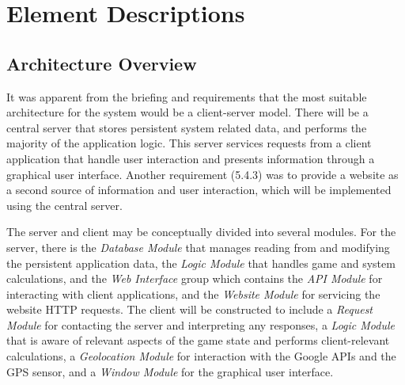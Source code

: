 \def\TabS#1#2{\small\tabular{#1}\rule[-1.5mm]{0pt}{5mm}{#2}
    \rule[-2mm]{0pt}{2mm}\endtabular\hspace{-1mm}}
\def\TabM#1#2{\tabular{#1}\rule[-1.5mm]{0pt}{7mm}{#2}
    \rule[-3mm]{0pt}{4mm}\endtabular\hspace{-1mm}}
\def\TabA#1#2#3{\small\tabular{#1}\rule[-1.5mm]{0pt}{5mm}\textbf{#2}\\
    \hline\rule[0mm]{0pt}{4mm}#3
    \rule[-2mm]{0pt}{2mm}\endtabular}
\def\TabB#1#2#3{\small\tabular{c}\rule[-1.5mm]{0pt}{5mm}
    \textbf{{\tiny$\ll$}#1{\tiny$\gg$}}\\
    \hline\rule[0mm]{0pt}{4mm}\tabular{ll}#2\endtabular \\
    \hline\rule[0mm]{0pt}{4mm}\tabular{ll}#3\endtabular
    \rule[-2mm]{0pt}{2mm}\endtabular}

\setcounter{section}{2}
\section{Element Descriptions}
\setcounter{subsection}{-1}
\subsection{Architecture Overview}
It was apparent from the briefing and requirements that the most suitable architecture for the system would be a client-server model. There will be a central server that stores persistent system related data, and performs the majority of the application logic. This server services requests from a client application that handle user interaction and presents information through a graphical user interface. Another requirement (5.4.3) was to provide a website as a second source of information and user interaction, which will be implemented using the central server.

The server and client may be conceptually divided into several modules. For the server, there is the \emph{Database Module} that manages reading from and modifying the persistent application data, the \emph{Logic Module} that handles game and system calculations, and the \emph{Web Interface} group which contains the \emph{API Module} for interacting with client applications, and the \emph{Website Module} for servicing the website HTTP requests. The client will be constructed to include a \emph{Request Module} for contacting the server and interpreting any responses, a \emph{Logic Module} that is aware of relevant aspects of the game state and performs client-relevant calculations, a \emph{Geolocation Module} for interaction with the Google APIs and the GPS sensor, and a \emph{Window Module} for the graphical user interface.

